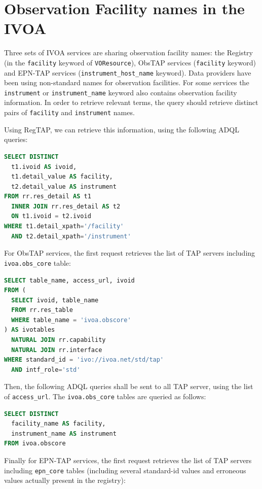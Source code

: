 \documentclass[11pt,a4paper]{ivoa}
\begin{document}
\section{Observation Facility names in the IVOA}

Three sets of IVOA services are sharing observation facility names:
the Registry (in the \texttt{facility} keyword of \texttt{VOResource}),
ObsTAP services (\texttt{facility} keyword) and EPN-TAP services
(\texttt{instrument\_host\_name} keyword). Data providers have been
using non-standard names for observation facilities. For some services
the \texttt{instrument} or \texttt{instrument\_name} keyword also contains
observation facility information. In order to retrieve relevant terms, the
query should retrieve distinct pairs of  \texttt{facility}  and
\texttt{instrument} names.

Using RegTAP, we can retrieve this information, using the following ADQL queries:

\begin{lstlisting}[language=SQL]
SELECT DISTINCT
  t1.ivoid AS ivoid,
  t1.detail_value AS facility,
  t2.detail_value AS instrument
FROM rr.res_detail AS t1
  INNER JOIN rr.res_detail AS t2
  ON t1.ivoid = t2.ivoid
WHERE t1.detail_xpath='/facility'
  AND t2.detail_xpath='/instrument'
\end{lstlisting}

For ObsTAP services, the first request retrieves the list of TAP
servers including \texttt{ivoa.obs\_core} table:

\begin{lstlisting}[language=SQL]
SELECT table_name, access_url, ivoid
FROM (
  SELECT ivoid, table_name
  FROM rr.res_table
  WHERE table_name = 'ivoa.obscore'
) AS ivotables
  NATURAL JOIN rr.capability
  NATURAL JOIN rr.interface
WHERE standard_id = 'ivo://ivoa.net/std/tap'
  AND intf_role='std'
\end{lstlisting}

Then, the following ADQL queries shall be sent to all TAP server,
using the list of \texttt{access\_url}. The \texttt{ivoa.obs\_core}
tables are queried as follows:

\begin{lstlisting}[language=SQL]
SELECT DISTINCT
  facility_name AS facility,
  instrument_name AS instrument
FROM ivoa.obscore
\end{lstlisting}

Finally for EPN-TAP services, the first request retrieves the list of TAP
servers including \texttt{epn\_core} tables (including several standard-id
values and erroneous values actually present in the registry):
\end{document}
